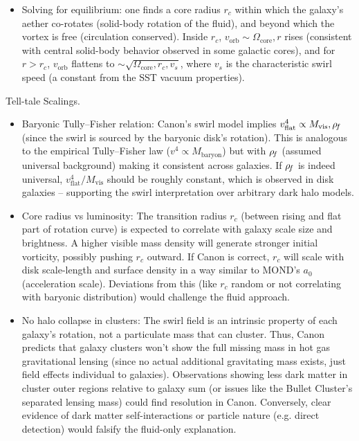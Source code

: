 \documentclass[11pt]{article}
\begin{document}
\begin{itemize}
\item 
Solving for equilibrium: one finds a core radius $r_c$ within which the galaxy’s aether co-rotates (solid-body rotation of the fluid), and beyond which the vortex is free (circulation conserved). Inside $r_c$, $v_{\text{orb}} \sim \Omega_{\text{core}},r$ rises (consistent with central solid-body behavior observed in some galactic cores), and for $r > r_c$, $v_{\text{orb}}$ flattens to $\sim \sqrt{\Omega_{\text{core}},r_c,v_s}$, where $v_s$ is the characteristic swirl speed (a constant from the SST vacuum properties).




\end{itemize}

Tell-tale Scalings.


\begin{itemize}

\item 
Baryonic Tully–Fisher relation: Canon’s swirl model implies $v_{\text{flat}}^4 \propto M_{\text{vis}},\rho_{\!f}$ (since the swirl is sourced by the baryonic disk’s rotation). This is analogous to the empirical Tully–Fisher law ($v^4 \propto M_{\text{baryon}}$) but with $\rho_{\!f}$ (assumed universal background) making it consistent across galaxies. If $\rho_{\!f}$ is indeed universal, $v_{\text{flat}}^4/M_{\text{vis}}$ should be roughly constant, which is observed in disk galaxies – supporting the swirl interpretation over arbitrary dark halo models.




\item 
Core radius vs luminosity: The transition radius $r_c$ (between rising and flat part of rotation curve) is expected to correlate with galaxy scale size and brightness. A higher visible mass density will generate stronger initial vorticity, possibly pushing $r_c$ outward. If Canon is correct, $r_c$ will scale with disk scale-length and surface density in a way similar to MOND’s $a_0$ (acceleration scale). Deviations from this (like $r_c$ random or not correlating with baryonic distribution) would challenge the fluid approach.




\item 
No halo collapse in clusters: The swirl field is an intrinsic property of each galaxy’s rotation, not a particulate mass that can cluster. Thus, Canon predicts that galaxy clusters won’t show the full missing mass in hot gas gravitational lensing (since no actual additional gravitating mass exists, just field effects individual to galaxies). Observations showing less dark matter in cluster outer regions relative to galaxy sum (or issues like the Bullet Cluster’s separated lensing mass) could find resolution in Canon. Conversely, clear evidence of dark matter self-interactions or particle nature (e.g. direct detection) would falsify the fluid-only explanation.




\end{itemize}
\end{document}
